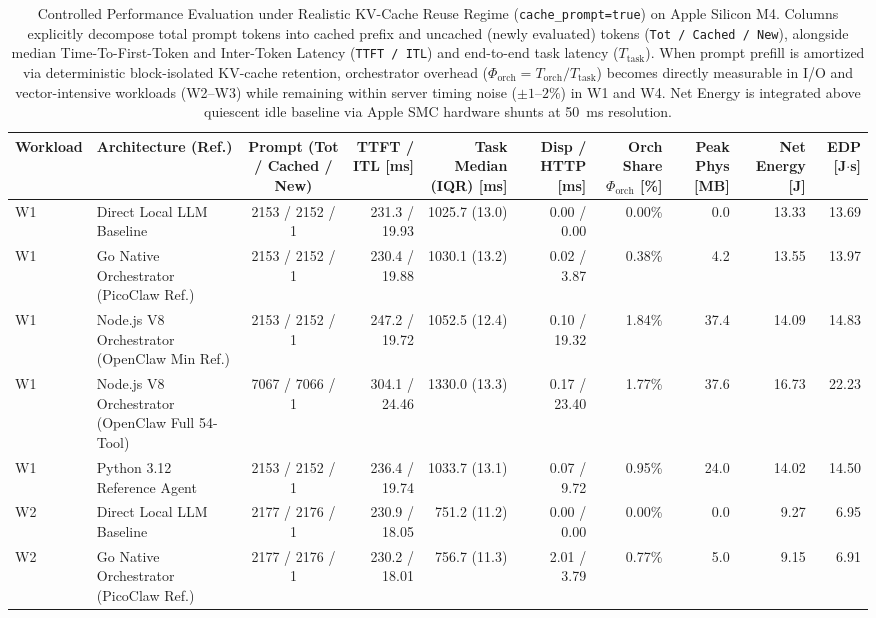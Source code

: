 \begin{table}[t]
\centering
\caption{Controlled Performance Evaluation under Realistic KV-Cache Reuse Regime (\texttt{cache\_prompt=true}) on Apple Silicon M4. Columns explicitly decompose total prompt tokens into cached prefix and uncached (newly evaluated) tokens (\texttt{Tot / Cached / New}), alongside median Time-To-First-Token and Inter-Token Latency (\texttt{TTFT / ITL}) and end-to-end task latency ($T_{\text{task}}$). When prompt prefill is amortized via deterministic block-isolated KV-cache retention, orchestrator overhead ($\Phi_{\text{orch}} = T_{\text{orch}} / T_{\text{task}}$) becomes directly measurable in I/O and vector-intensive workloads (W2--W3) while remaining within server timing noise ($\pm 1\text{--}2\%$) in W1 and W4. Net Energy is integrated above quiescent idle baseline via Apple SMC hardware shunts at 50~ms resolution.}
\label{tab:evaluation_warm_cache_m4}
\scriptsize
\setlength{\tabcolsep}{3.5pt}
\begin{tabular}{l l c r r r r r r r}
\hline
\textbf{Workload} & \textbf{Architecture (Ref.)} & \textbf{Prompt (Tot / Cached / New)} & \textbf{TTFT / ITL [ms]} & \textbf{Task Median (IQR) [ms]} & \textbf{Disp / HTTP [ms]} & \textbf{Orch Share $\Phi_{\text{orch}}$ [\%]} & \textbf{Peak Phys [MB]} & \textbf{Net Energy [J]} & \textbf{EDP [J$\cdot$s]} \\
\hline
W1 & Direct Local LLM Baseline & 2153 / 2152 / 1 & 231.3 / 19.93 & 1025.7 (13.0) & 0.00 / 0.00 & 0.00\% & 0.0 & 13.33 & 13.69 \\
W1 & Go Native Orchestrator (PicoClaw Ref.) & 2153 / 2152 / 1 & 230.4 / 19.88 & 1030.1 (13.2) & 0.02 / 3.87 & 0.38\% & 4.2 & 13.55 & 13.97 \\
W1 & Node.js V8 Orchestrator (OpenClaw Min Ref.) & 2153 / 2152 / 1 & 247.2 / 19.72 & 1052.5 (12.4) & 0.10 / 19.32 & 1.84\% & 37.4 & 14.09 & 14.83 \\
W1 & Node.js V8 Orchestrator (OpenClaw Full 54-Tool) & 7067 / 7066 / 1 & 304.1 / 24.46 & 1330.0 (13.3) & 0.17 / 23.40 & 1.77\% & 37.6 & 16.73 & 22.23 \\
W1 & Python 3.12 Reference Agent & 2153 / 2152 / 1 & 236.4 / 19.74 & 1033.7 (13.1) & 0.07 / 9.72 & 0.95\% & 24.0 & 14.02 & 14.50 \\
\hline
W2 & Direct Local LLM Baseline & 2177 / 2176 / 1 & 230.9 / 18.05 & 751.2 (11.2) & 0.00 / 0.00 & 0.00\% & 0.0 & 9.27 & 6.95 \\
W2 & Go Native Orchestrator (PicoClaw Ref.) & 2177 / 2176 / 1 & 230.2 / 18.01 & 756.7 (11.3) & 2.01 / 3.79 & 0.77\% & 5.0 & 9.15 & 6.91 \\

\end{tabular}
\end{table}

